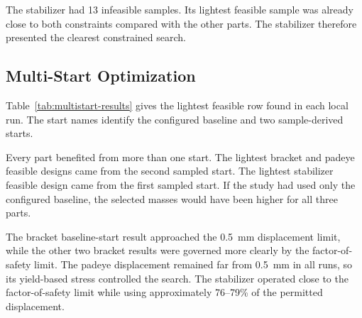 The stabilizer had 13 infeasible samples. Its lightest feasible sample was
already close to both constraints compared with the other parts. The
stabilizer therefore presented the clearest constrained search.

\subsection{Multi-Start Optimization}
\label{sec:multistart-results}

Table~\ref{tab:multistart-results} gives the lightest feasible row found in
each local run. The start names identify the configured baseline and two
sample-derived starts.

\begin{table}[H]
\centering
\caption{Lightest feasible result from each Nelder--Mead start}
\label{tab:multistart-results}
\end{table}

Every part benefited from more than one start. The lightest bracket and
padeye feasible designs came from the second sampled start. The lightest
stabilizer feasible design came from the first sampled start. If the study had
used only the configured baseline, the selected masses would have been higher
for all three parts.

The bracket baseline-start result approached the 0.5~mm displacement limit,
while the other two bracket results were governed more clearly by the
factor-of-safety limit. The padeye displacement remained far from 0.5~mm in
all runs, so its yield-based stress controlled the search. The stabilizer
operated close to the factor-of-safety limit while using approximately
76--79\% of the permitted displacement.


